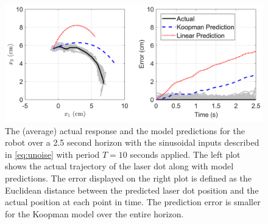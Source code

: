 \begin{figure}
    \centering
    \includegraphics[width=\linewidth]{figures/predictionComparison_v5.pdf}
    \caption{The (average) actual response and the model predictions for the robot over a 2.5 second horizon with the sinusoidal inputs described in \eqref{eq:unoise} with period $T = 10$ seconds applied. The left plot shows the actual trajectory of the laser dot along with model predictions. The error displayed on the right plot is defined as the Euclidean distance between the predicted laser dot position and the actual position at each point in time. The prediction error is smaller for the Koopman model over the entire horizon.}
    \label{fig:predict}
\end{figure}


